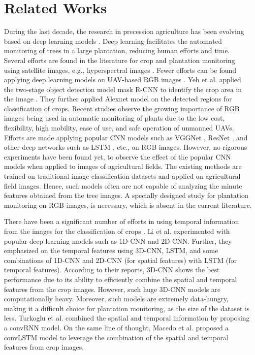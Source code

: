 \section{Related Works}
During the last decade, the research in precession agriculture has been evolving based on deep learning models \cite{c1,c2}. Deep learning facilitates the automated monitoring of trees in a large plantation, reducing human efforts and time. Several efforts are found in the literature for crop and plantation monitoring using satellite images, e.g., hyperspectral images \cite{afe_23}. Fewer efforts can be found applying deep learning models on UAV-based RGB images \cite{c3}. Yeh et al. applied the two-stage object detection model mask R-CNN to identify the crop area in the image \cite{afe_23_2}. They further applied Alexnet model on the detected regions for classification of crops. Recent studies \cite{c10,cvip} observe the growing importance of RGB images being used in automatic monitoring of plants due to the low cost, flexibility, high mobility, ease of use, and safe operation of unmanned UAVs. Efforts are made applying popular CNN models such as VGGNet \cite{c7}, ResNet \cite{c9}, and other deep networks such as LSTM \cite{c2}, etc., on RGB images. However, no rigorous experiments have been found yet, to observe the effect of the popular CNN models when applied to images of agricultural fields. The existing methods are trained on traditional image classification datasets and applied on agricultural field images. Hence, such models often are not capable of analyzing the minute features obtained from the tree images. A specially designed study for plantation monitoring on RGB images, is necessary, which is absent in the current literature.

There have been a significant number of efforts in using temporal information from the images for the classification of crops \cite{agri23,rse21}. Li et al. \cite{agri23} experimented with popular deep learning models such as 1D-CNN and 2D-CNN. Further, they emphasized on the temporal features using 3D-CNN, LSTM, and some combinations of 1D-CNN and 2D-CNN (for spatial features) with LSTM (for temporal features). According to their reports, 3D-CNN shows the best performance due to its ability to efficiently combine the spatial and temporal features from the crop images. However, such huge 3D-CNN models are computationally heavy. Moreover, such models are extremely data-hungry, making it a difficult choice for plantation monitoring, as the size of the dataset is less. Turkoglu et al. \cite{rse21} combined the spatial and temporal information by proposing a convRNN model. On the same line of thought, Macedo et al. \cite{c2} proposed a convLSTM model to leverage the combination of the spatial and temporal features from crop images.

